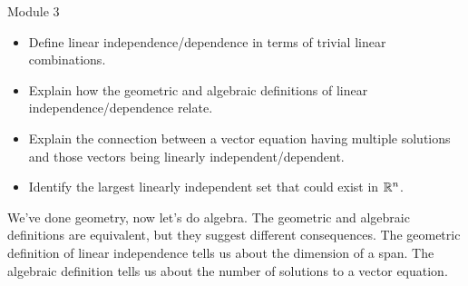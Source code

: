 \documentclass{workbook}
\begin{document}
\begin{lesson}

	Module 3

	\begin{itemize}
		\item Define linear independence/dependence in terms of trivial linear combinations.
		\item Explain how the geometric and algebraic definitions of linear independence/dependence relate.
		\item Explain the connection between a vector equation having multiple
			solutions and those vectors being linearly independent/dependent.
		\item Identify the largest linearly independent set that could exist in $\mathbb{R}^n$.
	\end{itemize}

	We've done geometry, now let's do algebra. The geometric and algebraic definitions
	are equivalent, but they suggest different consequences. The geometric definition
	of linear independence tells us about the dimension of a span. The algebraic
	definition tells us about the number of solutions to a vector equation.

\end{lesson}
\end{document}
